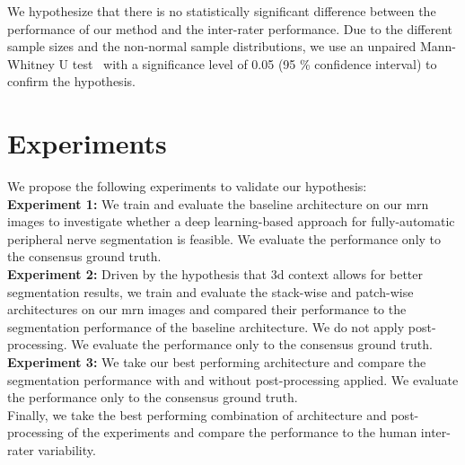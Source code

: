 We hypothesize that there is no statistically significant difference between the performance of our method and the inter-rater performance. Due to the different sample sizes and the non-normal sample distributions, we use an unpaired Mann-Whitney U test~\cite{Mann1947OnOther} with a significance level of 0.05 (95 \% confidence interval) to confirm the hypothesis.

\section{Experiments} \label{sec:experiments}
We propose the following experiments to validate our hypothesis:\\

\textbf{Experiment 1:} We train and evaluate the baseline architecture on our \gls{mrn} images to investigate whether a deep learning-based approach for fully-automatic peripheral nerve segmentation is feasible. We evaluate the performance only to the consensus ground truth.\\

\textbf{Experiment 2:} Driven by the hypothesis that \gls{3d} context allows for better segmentation results, we train and evaluate the stack-wise and patch-wise architectures on our \gls{mrn} images and compared their performance to the segmentation performance of the baseline architecture. We do not apply post-processing. We evaluate the performance only to the consensus ground truth.\\

\textbf{Experiment 3:} We take our best performing architecture and compare the segmentation performance with and without post-processing applied. We evaluate the performance only to the consensus ground truth.\\

Finally, we take the best performing combination of architecture and post-processing of the experiments and compare the performance to the human inter-rater variability.

\endinput